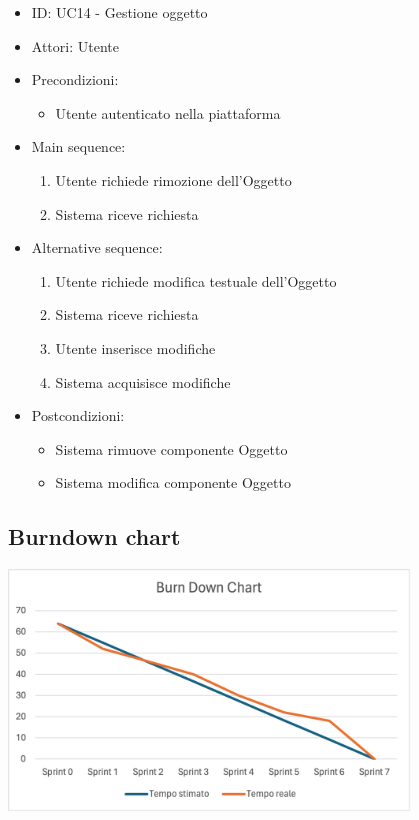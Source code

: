 \documentclass{article}
\begin{document}
\begin{itemize}[label = {-}]
    \itemsep0px
    \item ID: UC14 - Gestione oggetto
    \item Attori: Utente
    \item Precondizioni: 
        \begin{itemize}[label = {-}]
            \item Utente autenticato nella piattaforma
        \end{itemize}
    \item Main sequence: 
        \begin{enumerate}
            \item Utente richiede rimozione dell'Oggetto
            \item Sistema riceve richiesta
        \end{enumerate}
    \item Alternative sequence:
        \begin{enumerate}
            \item Utente richiede modifica testuale dell'Oggetto
            \item Sistema riceve richiesta
            \item Utente inserisce modifiche
            \item Sistema acquisisce modifiche
        \end{enumerate}
    \item Postcondizioni: 
        \begin{itemize}[label = {-}]
            \item Sistema rimuove componente Oggetto
            \item Sistema modifica componente Oggetto
        \end{itemize}
\end{itemize}

\subsection*{Burndown chart}
\large
\begin{center}
    \includegraphics[width=0.8\textwidth]{foto3.png}
\end{center}
\end{document}
